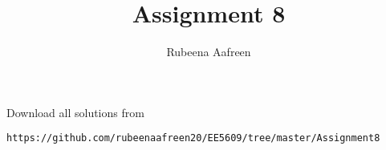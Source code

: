 \documentclass[journal,12pt,twocolumn]{IEEEtran}
\DeclareMathOperator*{\Res}{Res}
\begin{document}
\newtheorem{theorem}{Theorem}[section]
\newtheorem{problem}{Problem}
\newtheorem{proposition}{Proposition}[section]
\newtheorem{lemma}{Lemma}[section]
\newtheorem{corollary}[theorem]{Corollary}
\newtheorem{example}{Example}[section]
\newtheorem{definition}[problem]{Definition}

\newcommand{\BEQA}{\begin{eqnarray}}
\newcommand{\EEQA}{\end{eqnarray}}
\newcommand{\define}{\stackrel{\triangle}{=}}

\providecommand{\mbf}{\mathbf}
\providecommand{\pr}[1]{\ensuremath{\Pr\left(#1\right)}}
\providecommand{\qfunc}[1]{\ensuremath{Q\left(#1\right)}}
\providecommand{\sbrak}[1]{\ensuremath{{}\left[#1\right]}}
\providecommand{\lsbrak}[1]{\ensuremath{{}\left[#1\right.}}
\providecommand{\rsbrak}[1]{\ensuremath{{}\left.#1\right]}}
\providecommand{\brak}[1]{\ensuremath{\left(#1\right)}}
\providecommand{\lbrak}[1]{\ensuremath{\left(#1\right.}}
\providecommand{\rbrak}[1]{\ensuremath{\left.#1\right)}}
\providecommand{\cbrak}[1]{\ensuremath{\left\{#1\right\}}}
\providecommand{\lcbrak}[1]{\ensuremath{\left\{#1\right.}}
\providecommand{\rcbrak}[1]{\ensuremath{\left.#1\right\}}}
\theoremstyle{remark}
\newtheorem{rem}{Remark}
\newcommand{\sgn}{\mathop{\mathrm{sgn}}}
\providecommand{\abs}[1]{\left\vert#1\right\vert}
\providecommand{\res}[1]{\Res\displaylimits_{#1}} 
\providecommand{\norm}[1]{\left\lVert#1\right\rVert}
\providecommand{\mtx}[1]{\mathbf{#1}}
\providecommand{\mean}[1]{E\left[ #1 \right]}
\providecommand{\fourier}{\overset{\mathcal{F}}{ \rightleftharpoons}}
\providecommand{\system}{\overset{\mathcal{H}}{ \longleftrightarrow}}
\newcommand{\solution}{\noindent \textbf{Solution: }}
\newcommand{\cosec}{\,\text{cosec}\,}
\providecommand{\dec}[2]{\ensuremath{\overset{#1}{\underset{#2}{\gtrless}}}}
\newcommand{\myvec}[1]{\ensuremath{\begin{pmatrix}#1\end{pmatrix}}}
\newcommand{\mydet}[1]{\ensuremath{\begin{vmatrix}#1\end{vmatrix}}}
\makeatletter
{}
\makeatother
\let\StandardTheFigure\thefigure
\let\vec\mathbf
\renewcommand{\thefigure}{\theproblem}
\def\putbox#1#2#3{\makebox[0in][l]{\makebox[#1][l]{}\raisebox{\baselineskip}[0in][0in]{\raisebox{#2}[0in][0in]{#3}}}}
     \def\rightbox#1{\makebox[0in][r]{#1}}
     \def\centbox#1{\makebox[0in]{#1}}
     \def\topbox#1{\raisebox{-\baselineskip}[0in][0in]{#1}}
     \def\midbox#1{\raisebox{-0.5\baselineskip}[0in][0in]{#1}}
\vspace{3cm}
\title{Assignment 8}
\author{Rubeena Aafreen}
\maketitle
\newpage
\bigskip
\renewcommand{\thefigure}{\theenumi}
\renewcommand{\thetable}{\theenumi}
Download all solutions from 
\begin{lstlisting}
https://github.com/rubeenaafreen20/EE5609/tree/master/Assignment8
\end{lstlisting}
%
%
\end{document}
